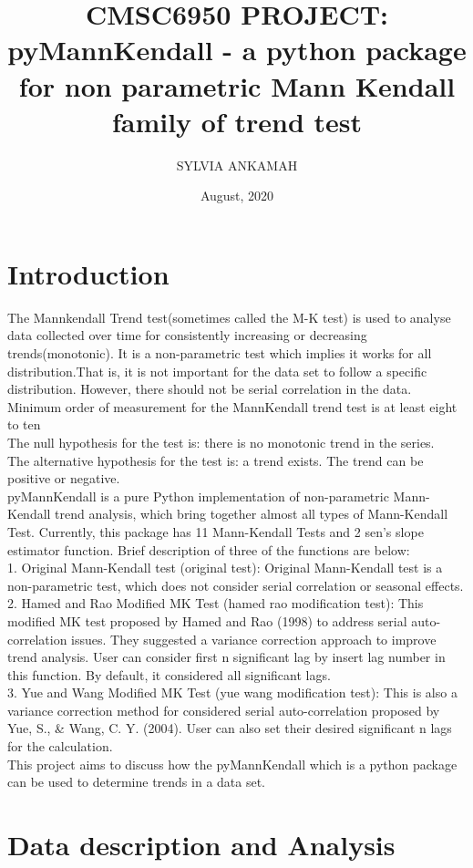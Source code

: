 \documentclass[12pt, letterpaper, twoside]{article}
\title{CMSC6950 PROJECT: 
pyMannKendall - a python package for non parametric Mann Kendall family of trend test}
\author{SYLVIA ANKAMAH}
\date{August, 2020}
\begin{document}
\maketitle
\section{Introduction}
The Mannkendall Trend test(sometimes called the M-K test) is used to analyse data collected over time for consistently increasing or decreasing trends(monotonic). It is a non-parametric test which implies it works for all distribution.That is, it is not important for the data set to follow a specific distribution. However, there should not be serial correlation in the data. Minimum order of measurement for the MannKendall trend test is at least eight to ten \\
The null hypothesis for the test is: there is no monotonic trend in the series.\\
The alternative hypothesis for the test is: a trend exists. The trend can be positive or negative.\\
pyMannKendall is a pure Python implementation of non-parametric Mann-Kendall trend analysis, which bring together almost all types of Mann-Kendall Test. Currently, this package has 11 Mann-Kendall Tests and 2 sen's slope estimator function. Brief description of three of the functions are below:\\
1. Original Mann-Kendall test (original test): Original Mann-Kendall test is a non-parametric test, which does not consider serial correlation or seasonal effects.\\
2. Hamed and Rao Modified MK Test (hamed rao modification test): This modified MK test proposed by Hamed and Rao (1998) to address serial auto-correlation issues. They suggested a variance correction approach to improve trend analysis. User can consider first n significant lag by insert lag number in this function. By default, it considered all significant lags.\\
3. Yue and Wang Modified MK Test (yue wang modification test): This is also a variance correction method for considered serial auto-correlation proposed by Yue, S., & Wang, C. Y. (2004). User can also set their desired significant n lags for the calculation.\\
This project aims to discuss how the pyMannKendall which is a python package can be used to determine trends in a data set.\\


\section{Data description and Analysis}
\end{document}
